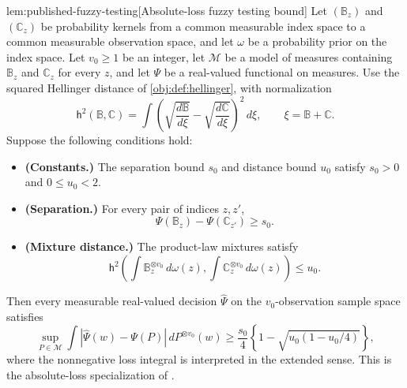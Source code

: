\documentclass[11pt]{article}
\begin{document}
\begin{lemmav}{lem:published-fuzzy-testing}[Absolute-loss fuzzy testing bound]
Let \((\mathbb B_z)\) and \((\mathbb C_z)\) be probability kernels from a common measurable index space to a common measurable observation space, and let \(\omega\) be a probability prior on the index space. Let \(v_0\ge1\) be an integer, let \(\mathcal M\) be a model of measures containing \(\mathbb B_z\) and \(\mathbb C_z\) for every \(z\), and let \(\Psi\) be a real-valued functional on measures. Use the squared Hellinger distance of \cref{obj:def:hellinger}, with normalization
\[
\mathsf h^2(\mathbb B,\mathbb C)
=
\int
\left(
\sqrt{\frac{d\mathbb B}{d\xi}}
-
\sqrt{\frac{d\mathbb C}{d\xi}}
\right)^2\,d\xi,
\qquad
\xi=\mathbb B+\mathbb C.
\]
Suppose the following conditions hold:
\begin{itemize}
\item \textbf{(Constants.)} The separation bound \(s_0\) and distance bound \(u_0\) satisfy \(s_0>0\) and \(0\le u_0<2\).
\item \textbf{(Separation.)} For every pair of indices \(z,z'\),
\[
\Psi(\mathbb B_z)-\Psi(\mathbb C_{z'})\ge s_0.
\]
\item \textbf{(Mixture distance.)} The product-law mixtures satisfy
\[
\mathsf h^2\left(
\int \mathbb B_z^{\otimes v_0}\,d\omega(z),
\int \mathbb C_z^{\otimes v_0}\,d\omega(z)
\right)\le u_0.
\]
\end{itemize}
Then every measurable real-valued decision \(\widehat\Psi\) on the \(v_0\)-observation sample space satisfies
\[
\sup_{P\in\mathcal M}
\int
\left|\widehat\Psi(w)-\Psi(P)\right|
\,dP^{\otimes v_0}(w)
\ge
\frac{s_0}{4}
\left\{1-\sqrt{u_0(1-u_0/4)}\right\},
\]
where the nonnegative loss integral is interpreted in the extended sense. This is the absolute-loss specialization of \citep[Section 3, Lemma 1]{KennedyBalakrishnanRobinsWasserman2024}.
\end{lemmav}
\end{document}
